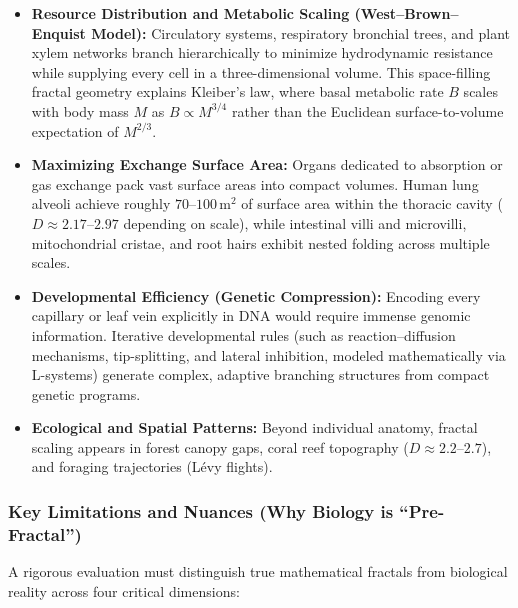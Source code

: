 \documentclass[12pt, letterpaper]{article}
\begin{document}
\begin{itemize}
    \item \textbf{Resource Distribution and Metabolic Scaling (West--Brown--Enquist Model):} Circulatory systems, respiratory bronchial trees, and plant xylem networks branch hierarchically to minimize hydrodynamic resistance while supplying every cell in a three-dimensional volume. This space-filling fractal geometry explains Kleiber's law, where basal metabolic rate $B$ scales with body mass $M$ as $B \propto M^{3/4}$ rather than the Euclidean surface-to-volume expectation of $M^{2/3}$.
    \item \textbf{Maximizing Exchange Surface Area:} Organs dedicated to absorption or gas exchange pack vast surface areas into compact volumes. Human lung alveoli achieve roughly $70\text{--}100\,\text{m}^2$ of surface area within the thoracic cavity ($D \approx 2.17\text{--}2.97$ depending on scale), while intestinal villi and microvilli, mitochondrial cristae, and root hairs exhibit nested folding across multiple scales.
    \item \textbf{Developmental Efficiency (Genetic Compression):} Encoding every capillary or leaf vein explicitly in DNA would require immense genomic information. Iterative developmental rules (such as reaction--diffusion mechanisms, tip-splitting, and lateral inhibition, modeled mathematically via L-systems) generate complex, adaptive branching structures from compact genetic programs.
    \item \textbf{Ecological and Spatial Patterns:} Beyond individual anatomy, fractal scaling appears in forest canopy gaps, coral reef topography ($D \approx 2.2\text{--}2.7$), and foraging trajectories (L\'evy flights).
\end{itemize}

\subsubsection*{Key Limitations and Nuances (Why Biology is ``Pre-Fractal'')}
A rigorous evaluation must distinguish true mathematical fractals from biological reality across four critical dimensions:
\end{document}

